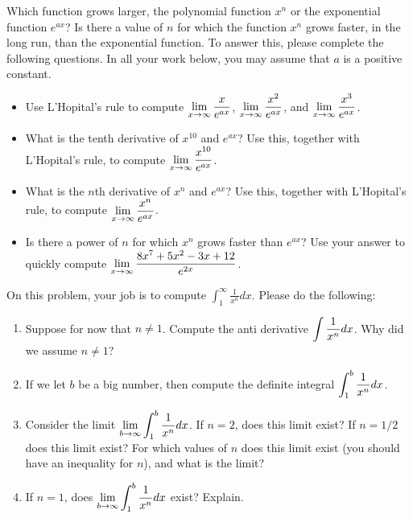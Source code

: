 \begin{problem}
 Which function grows larger, the polynomial function $x^n$ or the exponential function $e^{ax}$? Is there a value of $n$ for which the function $x^n$ grows faster, in the long run, than the exponential function. To answer this, please complete the following questions.  In all your work below, you may assume that $a$ is a positive constant.
\begin{itemize}
 \item Use L'Hopital's rule to compute $\displaystyle\lim_{x\to\infty}\frac{x}{e^{ax}}$, $\displaystyle\lim_{x\to\infty}\frac{x^2}{e^{ax}}$, and $\displaystyle\lim_{x\to\infty}\frac{x^3}{e^{ax}}$.
 \item What is the tenth derivative of $x^{10}$ and $e^{ax}$? Use this, together with L'Hopital's rule, to compute $\displaystyle\lim_{x\to\infty}\frac{x^{10}}{e^{ax}}$.
 \item What is the $n$th derivative of $x^{n}$ and $e^{ax}$? Use this, together with L'Hopital's rule, to compute $\displaystyle\lim_{x\to\infty}\frac{x^n}{e^{ax}}$.
\item Is there a power of $n$ for which $x^n$ grows faster than $e^{ax}$? Use your answer to quickly compute $\displaystyle\lim_{x\to\infty}\frac{8x^7+5x^2-3x+12}{e^{2x}}$.
\end{itemize}

\end{problem}


\begin{problem}
 On this problem, your job is to compute $\int_1^\infty \frac{1}{x^n}dx$. Please do the following:
\begin{enumerate}
 \item Suppose for now that $n\neq 1$.  Compute the anti derivative $\displaystyle\int\frac{1}{x^n}dx$.  Why did we assume $n\neq 1$?
 \item If we let $b$ be a big number, then compute the definite integral $\displaystyle\int_1^b \frac{1}{x^n}dx$.  
 \item Consider the limit $\displaystyle\lim_{b\to\infty}\int_1^b \frac{1}{x^n}dx$. If $n=2$, does this limit exist?  If $n=1/2$ does this limit exist?  For which values of $n$ does this limit exist (you should have an inequality for $n$), and what is the limit? 
 \item If $n=1$, does $\displaystyle\lim_{b\to\infty}\int_1^b \frac{1}{x^n}dx$ exist? Explain.
\end{enumerate}
\end{problem}



